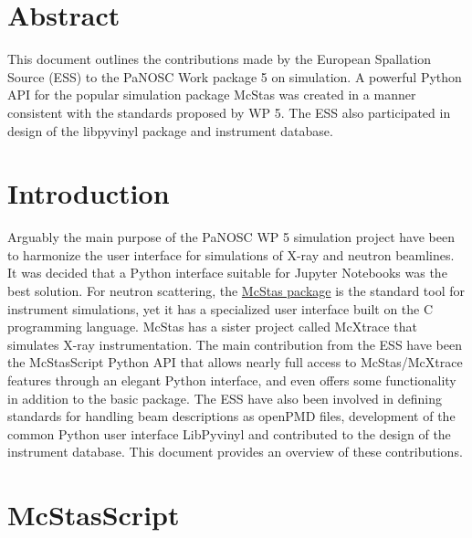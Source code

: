 \documentclass[11pt, a4paper]{article}
\begin{document}
\section{Abstract}
This document outlines the contributions made by the European Spallation Source (ESS) to the PaNOSC Work package 5 on simulation. A powerful Python API for the popular simulation package McStas was created in a manner consistent with the standards proposed by WP 5. The ESS also participated in design of the libpyvinyl package and instrument database.

\section{Introduction}
Arguably the main purpose of the PaNOSC WP 5 simulation project have been to harmonize the user interface for simulations of X-ray and neutron beamlines. It was decided that a Python interface suitable for Jupyter Notebooks was the best solution. For neutron scattering, the \href{https://www.mcstas.org}{McStas package} is the standard tool for instrument simulations, yet it has a specialized user interface built on the C programming language. McStas has a sister project called McXtrace that simulates X-ray instrumentation. The main contribution from the ESS have been the McStasScript Python API that allows nearly full access to McStas/McXtrace features through an elegant Python interface, and even offers some functionality in addition to the basic package. The ESS have also been involved in defining standards for handling beam descriptions as openPMD files, development of the common Python user interface LibPyvinyl and contributed to the design of the instrument database. This document provides an overview of these contributions.

\section{McStasScript}
\end{document}
